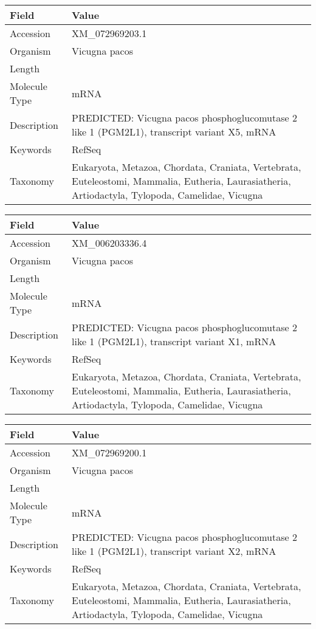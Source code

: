 \documentclass[10pt]{article}
\begin{document}
\vspace{1em}
{\footnotesize
\begin{longtable}{>{\raggedright\arraybackslash}p{4.5cm} >{\raggedright\arraybackslash}p{11.5cm}}
\textbf{Field} & \textbf{Value} \\
\hline
Accession & XM\_072969203.1 \\
Organism & Vicugna pacos \\
Length & 2203 \\
Molecule Type & mRNA \\
Description & PREDICTED: Vicugna pacos phosphoglucomutase 2 like 1 (PGM2L1), transcript variant X5, mRNA \\
Keywords & RefSeq \\
Taxonomy & Eukaryota, Metazoa, Chordata, Craniata, Vertebrata, Euteleostomi, Mammalia, Eutheria, Laurasiatheria, Artiodactyla, Tylopoda, Camelidae, Vicugna \\
\end{longtable}
}

\vspace{1em}
{\footnotesize
\begin{longtable}{>{\raggedright\arraybackslash}p{4.5cm} >{\raggedright\arraybackslash}p{11.5cm}}
\textbf{Field} & \textbf{Value} \\
\hline
Accession & XM\_006203336.4 \\
Organism & Vicugna pacos \\
Length & 5787 \\
Molecule Type & mRNA \\
Description & PREDICTED: Vicugna pacos phosphoglucomutase 2 like 1 (PGM2L1), transcript variant X1, mRNA \\
Keywords & RefSeq \\
Taxonomy & Eukaryota, Metazoa, Chordata, Craniata, Vertebrata, Euteleostomi, Mammalia, Eutheria, Laurasiatheria, Artiodactyla, Tylopoda, Camelidae, Vicugna \\
\end{longtable}
}

\vspace{1em}
{\footnotesize
\begin{longtable}{>{\raggedright\arraybackslash}p{4.5cm} >{\raggedright\arraybackslash}p{11.5cm}}
\textbf{Field} & \textbf{Value} \\
\hline
Accession & XM\_072969200.1 \\
Organism & Vicugna pacos \\
Length & 3451 \\
Molecule Type & mRNA \\
Description & PREDICTED: Vicugna pacos phosphoglucomutase 2 like 1 (PGM2L1), transcript variant X2, mRNA \\
Keywords & RefSeq \\
Taxonomy & Eukaryota, Metazoa, Chordata, Craniata, Vertebrata, Euteleostomi, Mammalia, Eutheria, Laurasiatheria, Artiodactyla, Tylopoda, Camelidae, Vicugna \\
\end{longtable}
}
\end{document}
